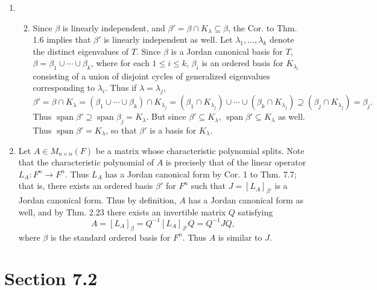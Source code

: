 \documentclass[12pt]{article}
\DeclareMathOperator{\spn}{span}
\begin{document}
\begin{enumerate}
\begin{enumerate}
\end{enumerate}

\setcounter{enumi}{8}
\item
\begin{enumerate}
\setcounter{enumii}{1}
\item
Since $\beta$ is linearly independent, and $\beta' = \beta \cap K_\lambda \subseteq \beta$, the Cor. to Thm. 1.6 implies that $\beta'$ is linearly independent as well. Let $\lambda_1, \dots, \lambda_k$ denote the distinct eigenvalues of $T$. Since $\beta$ is a Jordan canonical basis for $T$, $\beta = \beta_1 \cup \cdots \cup \beta_k$, where for each $1 \leq i \leq k$, $\beta_i$ is an ordered basis for $K_{\lambda_i}$ consisting of a union of disjoint cycles of generalized eigenvalues corresponding to $\lambda_i$. Thus if $\lambda = \lambda_j$,
\begin{equation*}
\beta' = \beta \cap K_\lambda = (\beta_1 \cup \cdots \cup \beta_k) \cap K_{\lambda_j} = (\beta_1 \cap K_{\lambda_j}) \cup \cdots \cup (\beta_k \cap K_{\lambda_j}) \supseteq (\beta_j \cap K_{\lambda_j}) = \beta_j.
\end{equation*}
Thus $\spn\beta' \supseteq \spn\beta_j = K_\lambda$. But since $\beta' \subseteq K_\lambda$, $\spn\beta' \subseteq K_\lambda$ as well. Thus $\spn\beta' = K_\lambda$, so that $\beta'$ is a basis for $K_\lambda$.

\end{enumerate}

\setcounter{enumi}{10}
\item
Let $A \in M_{n \times n}(F)$ be a matrix whose characteristic polynomial splits. Note that the characteristic polynomial of $A$ is precisely that of the linear operator $L_A : F^n \to F^n$. Thus $L_A$ has a Jordan canonical form by Cor. 1 to Thm. 7.7; that is, there exists an ordered basis $\beta'$ for $F^n$ such that $J = [L_A]_{\beta'}$ is a Jordan canonical form. Thus by definition, $A$ has a Jordan canonical form as well, and by Thm. 2.23 there exists an invertible matrix $Q$ satisfying
\begin{equation*}
A = [L_A]_\beta = Q^{-1} [L_A]_{\beta'} Q = Q^{-1} J Q,
\end{equation*}
where $\beta$ is the standard ordered basis for $F^n$. Thus $A$ is similar to $J$.

\end{enumerate}

\section*{Section 7.2}
\end{document}

